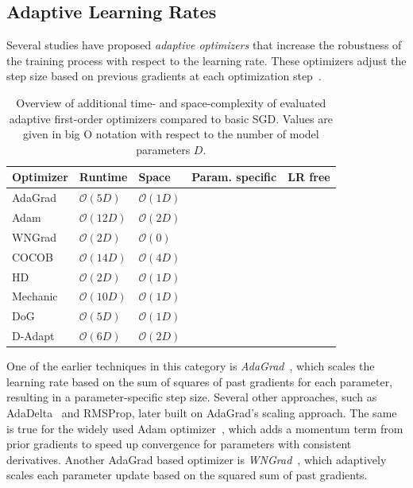\documentclass[runningheads]{llncs}
\newcommand{\cmark}{\ding{51}} %
\newcommand{\xmark}{\ding{55}} %
\begin{document}
\subsection{Adaptive Learning Rates}

Several studies have proposed \textit{adaptive optimizers} that increase the robustness of the training process with respect to the learning rate.
These optimizers adjust the step size based on previous gradients at each optimization step~\cite{duchiAdaptiveSubgradientMethods2011}.

\begin{table}[ht]
	\centering
	\scriptsize
	\caption{
		Overview of additional time- and space-complexity of evaluated adaptive first-order optimizers compared to basic SGD.
		Values are given in big O notation with respect to the number of model parameters $D$.
	}\label{tab:param_free_optims}
	\begin{tabular}{@{}lllcc@{}}
		\toprule
		Optimizer                & Runtime            & Space             & Param. specific & LR free \\ \midrule
		AdaGrad                  & $\mathcal{O}(5D)$  & $\mathcal{O}(1D)$ & \cmark          & \xmark  \\
		Adam                     & $\mathcal{O}(12D)$ & $\mathcal{O}(2D)$ & \cmark          & \xmark  \\
		WNGrad                   & $\mathcal{O}(2D)$  & $\mathcal{O}(0)$  & \xmark          & \xmark  \\
		COCOB                    & $\mathcal{O}(14D)$ & $\mathcal{O}(4D)$ & \cmark          & \cmark  \\
		HD\footnotemark[1]       & $\mathcal{O}(2D)$  & $\mathcal{O}(1D)$ & \xmark          & \xmark  \\
		Mechanic\footnotemark[1] & $\mathcal{O}(10D)$ & $\mathcal{O}(1D)$ & \cmark          & \cmark  \\
		DoG                      & $\mathcal{O}(5D)$  & $\mathcal{O}(1D)$ & \xmark          & \cmark  \\
		D-Adapt\footnotemark[1]  & $\mathcal{O}(6D)$  & $\mathcal{O}(2D)$ & \xmark          & \cmark  \\
		\bottomrule
	\end{tabular}
\end{table}

One of the earlier techniques in this category is \textit{AdaGrad}~\cite{duchiAdaptiveSubgradientMethods2011}, which scales the learning rate based on the sum of squares of past gradients for each parameter, resulting in a parameter-specific step size.
Several other approaches, such as AdaDelta~\cite{zeilerADADELTAAdaptiveLearning2012a} and RMSProp, later built on AdaGrad's scaling approach.
The same is true for the widely used Adam optimizer~\cite{kingmaAdamMethodStochastic2017b}, which adds a momentum term from prior gradients to speed up convergence for parameters with consistent derivatives.
Another AdaGrad based optimizer is \textit{WNGrad}~\cite{wuWNGradLearnLearning2020}, which adaptively scales each parameter update based on the squared sum of past gradients.
\end{document}
